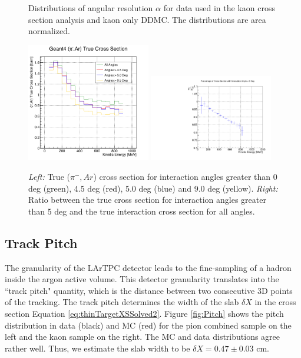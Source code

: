 \begin{figure}[ht]
\begin{minipage}[t]{0.45\linewidth}
\caption[]{Distributions of angular resolution $\alpha$ for data used in the kaon cross section analysis and kaon only DDMC. The distributions are area normalized. } \label{fig:trackingResolutionK}
\end{minipage}
\end{figure}





\begin{figure}[p]
\centering
\includegraphics[width=0.48\textwidth]{Chapter-5/Images/cTrueXSAngle.png}
\includegraphics[width=0.48\textwidth]{Chapter-5/Images/RatioXSs.pdf}
\caption{\emph{Left:} True ($\pi^-, Ar$) cross section for interaction angles greater than 0 deg (green), 4.5 deg (red), 5.0 deg  (blue) and 9.0 deg (yellow). \emph{Right:} Ratio between the true cross section for interaction angles greater than 5 deg and the true interaction cross section for all angles.}
\label{fig:trueWithAngles}
\end{figure}



\subsection{Track Pitch}\label{sec:trackPitch}
The granularity of the LArTPC detector leads to the fine-sampling of a hadron inside the argon active volume. This detector granularity translates into the ``track pitch" quantity, which is the distance between two consecutive 3D points of the tracking. The track pitch determines the width of the slab $\delta X$ in the cross section Equation \ref{eq:thinTargetXSSolved2}. Figure \ref{fig:Pitch} shows the pitch distribution in data (black) and MC (red) for the pion combined sample on the left and the kaon sample on the right. The MC and data distributions agree rather well.   Thus, we estimate the slab width to be $\delta X = 0.47 \pm 0.03 $ cm.



